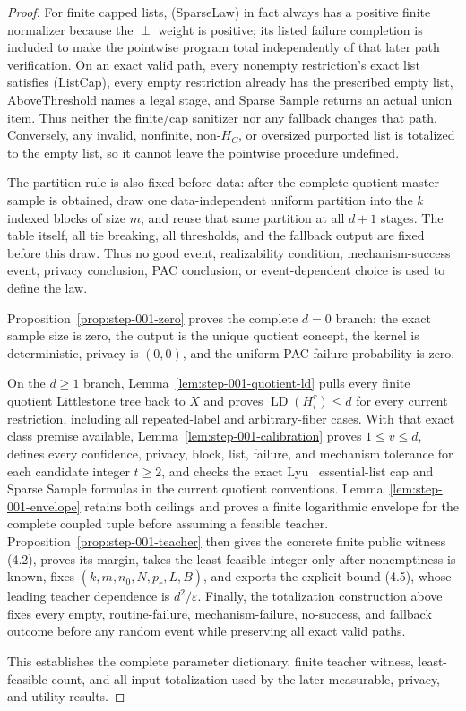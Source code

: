 \begin{proof}
For finite capped lists, (SparseLaw) in fact always has a positive finite
normalizer because the \(\perp\) weight is positive; its listed failure
completion is included to make the pointwise program total independently of
that later path verification. On an exact valid path, every nonempty
restriction's exact list satisfies (ListCap), every empty restriction already
has the prescribed empty list, AboveThreshold names a legal stage, and Sparse
Sample returns an actual union item. Thus neither the finite/cap sanitizer nor
any fallback changes that path. Conversely, any invalid, nonfinite,
non-\(H_C\), or oversized purported list is totalized to the empty list, so
it cannot leave the pointwise procedure undefined.

The partition rule is also fixed before data: after the complete quotient
master sample is obtained, draw one data-independent uniform partition into
the \(k\) indexed blocks of size \(m\), and reuse that same partition at all
\(d+1\) stages. The table itself, all tie breaking, all thresholds, and the
fallback output are fixed before this draw. Thus no good event, realizability
condition, mechanism-success event, privacy conclusion, PAC conclusion, or
event-dependent choice is used to define the law.

Proposition~\ref{prop:step-001-zero} proves the complete \(d=0\) branch:
the exact sample size is zero, the output is the unique quotient concept,
the kernel is deterministic, privacy is \((0,0)\), and the uniform PAC
failure probability is zero.

On the \(d\ge1\) branch,
Lemma~\ref{lem:step-001-quotient-ld} pulls every finite quotient
Littlestone tree back to \(X\) and proves
\(\operatorname{LD}(H_i^r)\le d\) for every current restriction, including
all repeated-label and arbitrary-fiber cases. With that exact class premise
available, Lemma~\ref{lem:step-001-calibration} proves \(1\le v\le d\),
defines every confidence, privacy, block, list, failure, and mechanism
tolerance for each candidate integer \(t\ge2\), and checks the exact Lyu~\citep{lyu2025}
essential-list cap and Sparse Sample formulas in the current quotient
conventions. Lemma~\ref{lem:step-001-envelope} retains both ceilings and
proves a finite logarithmic envelope for the complete coupled tuple before
assuming a feasible teacher. Proposition~\ref{prop:step-001-teacher} then
gives the concrete finite public witness (4.2), proves its margin, takes the
least feasible integer only after nonemptiness is known, fixes
\((k,m,n_0,N,p_r,L,B)\), and exports the explicit bound (4.5), whose leading
teacher dependence is \(d^2/\varepsilon\). Finally, the totalization
construction above fixes every empty,
routine-failure, mechanism-failure, no-success, and fallback outcome before
any random event while preserving all exact valid paths.

This establishes the complete parameter dictionary, finite teacher witness,
least-feasible count, and all-input totalization used by the later measurable,
privacy, and utility results.



\end{proof}

